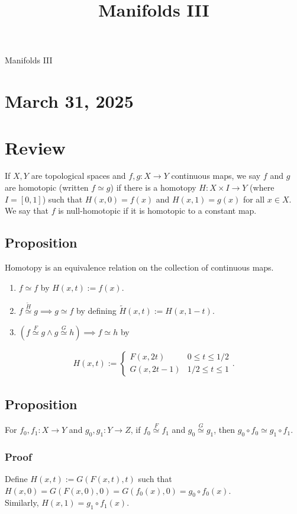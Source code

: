 \documentclass[11pt]{article}
\date{}
\title{Manifolds III}
\begin{document}
{\centering
{\LARGE Manifolds III \par }}
\section*{March 31, 2025}
\label{sec:org5a0a6c1}
\section*{Review}
\label{sec:orgd37a1b1}
If \(X,Y\) are topological spaces and \(f,g:X\to Y\) continuous maps, we say \(f\) and \(g\) are homotopic (written \(f\simeq g\)) if there is a homotopy \(H:X\times I\to Y\) (where \(I=[0,1]\)) such that \(H(x,0)=f(x)\) and \(H(x,1)=g(x)\) for all \(x\in X\).\\
We say that \(f\) is null-homotopic if it is homotopic to a constant map.\\
\subsection*{Proposition}
\label{sec:org04f8ec6}
Homotopy is an equivalence relation on the collection of continuous maps.\\
\begin{enumerate}
\item \(f\simeq f\) by \(H(x,t):=f(x)\).\\
\item \(f\overset{\tilde{H}}\simeq g\implies g\simeq f\) by defining \(\tilde{H}(x,t):=H(x,1-t)\).\\
\item \((f\overset{F}\simeq g\land g\overset{G}\simeq h)\implies f\simeq h\) by\\
\end{enumerate}
\begin{align*}
  H(x,t):=\begin{cases}
    F(x,2t) & 0\leq t\leq 1/2 \\
    G(x,2t-1) & 1/2\leq t\leq 1
  \end{cases}.
\end{align*}
\subsection*{Proposition}
\label{sec:org1933e99}
For \(f_{0},f_{1}:X\to Y\) and \(g_{0},g_{1}:Y\to Z\), if \(f_{0}\overset{F}\simeq f_{1}\) and \(g_{0}\overset{G}\simeq g_{1}\), then \(g_{0}\circ f_{0}\simeq g_{1}\circ f_{1}\).\\
\subsubsection*{Proof}
\label{sec:orgd98e8a7}
Define \(H(x,t):=G(F(x,t),t)\) such that \(H(x,0)=G(F(x,0),0)=G(f_{0}(x),0)=g_{0}\circ f_{0}(x)\).\\
Similarly, \(H(x,1)=g_{1}\circ f_{1}(x)\).\\
\end{document}
